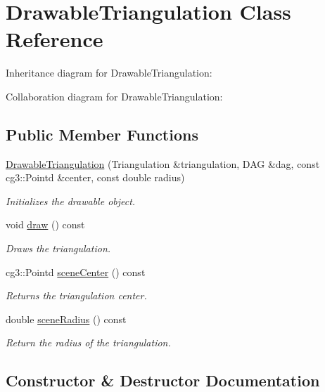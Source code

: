 \hypertarget{classDrawableTriangulation}{}\section{Drawable\+Triangulation Class Reference}
\label{classDrawableTriangulation}


Inheritance diagram for Drawable\+Triangulation\+:


Collaboration diagram for Drawable\+Triangulation\+:
\subsection*{Public Member Functions}
\begin{DoxyCompactItemize}
\item 
\hyperlink{classDrawableTriangulation_a2025131e8964746883f1493f177f8e39}{Drawable\+Triangulation} (Triangulation \&triangulation, D\+AG \&dag, const cg3\+::\+Pointd \&center, const double radius)
\begin{DoxyCompactList}\small\item\em Initializes the drawable object. \end{DoxyCompactList}\item 
void \hyperlink{classDrawableTriangulation_a364e9b612571481930770fdfa9d68148}{draw} () const
\begin{DoxyCompactList}\small\item\em Draws the triangulation. \end{DoxyCompactList}\item 
cg3\+::\+Pointd \hyperlink{classDrawableTriangulation_a3198ae77285c354fd020f5b18df718f5}{scene\+Center} () const
\begin{DoxyCompactList}\small\item\em Returns the triangulation center. \end{DoxyCompactList}\item 
double \hyperlink{classDrawableTriangulation_a0aee9121b146c327dbbd741c3dc58c0a}{scene\+Radius} () const
\begin{DoxyCompactList}\small\item\em Return the radius of the triangulation. \end{DoxyCompactList}\end{DoxyCompactItemize}


\subsection{Constructor \& Destructor Documentation}
\mbox{\label{classDrawableTriangulation_a2025131e8964746883f1493f177f8e39}} 
